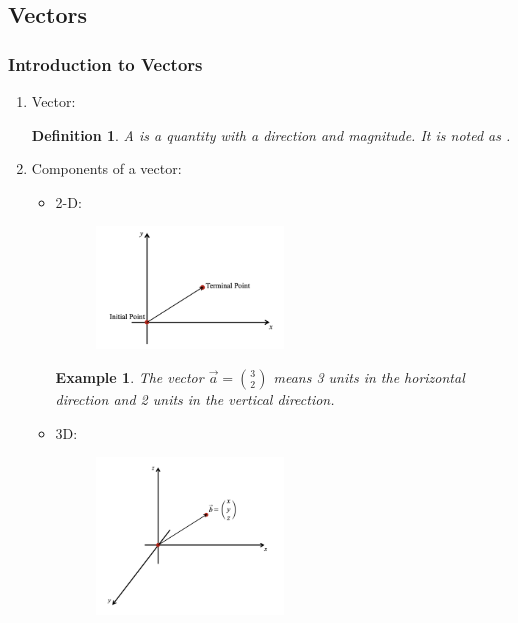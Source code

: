 \documentclass[12pt, a4paper]{article}
\newtheorem{definition}{Definition}[subsection]
\newtheorem{example}{Example}[subsection]
\begin{document}
\subsection{Vectors}
\subsubsection{Introduction to Vectors}
\begin{enumerate}
  \item Vector: 
  \begin{definition}
    A \textbf{\color{red}{vector}} is a quantity with a direction and magnitude. It is noted as {}.
  \end{definition}
  \item Components of a vector: 
  \begin{itemize}
    \item 2-D: 
    \begin{figure}[H]
      \centering
      \includegraphics[width=0.5\textwidth]{Fig.3.1.jpg}
    \end{figure}
    \begin{example}
      The vector $\vec{a}=\binom{3}{2}$ means 3 units in the horizontal direction and 2 units in the vertical direction.
    \end{example}
    \item 3D: 
    \begin{figure}[H]
      \centering
      \includegraphics[width=0.5\textwidth]{Fig.3.2.jpg}
    \end{figure}

\end{itemize}
\end{enumerate}
\end{document}
